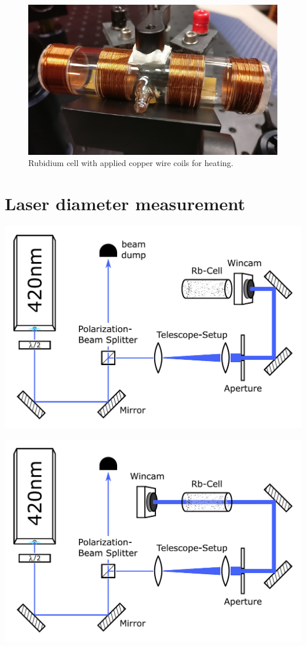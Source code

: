 \begin{figure}[H]
    \centering
    \includegraphics[width=.6\textwidth]{rbcell_coils}
    \caption{\label{fig:coils} Rubidium cell with applied copper wire coils for
    heating.}
\end{figure}


\pagebreak
\section{\label{sec:laser_dia_measurement}Laser diameter measurement} %
\begin{minipage}[c]{.45\textwidth}
    \centering
    \includegraphics[width=.9\textwidth]{wincam_before}
\end{minipage}
\hfill
\begin{minipage}[c]{.45\textwidth}
    \centering
    \includegraphics[width=.9\textwidth]{wincam_after}
\end{minipage}


